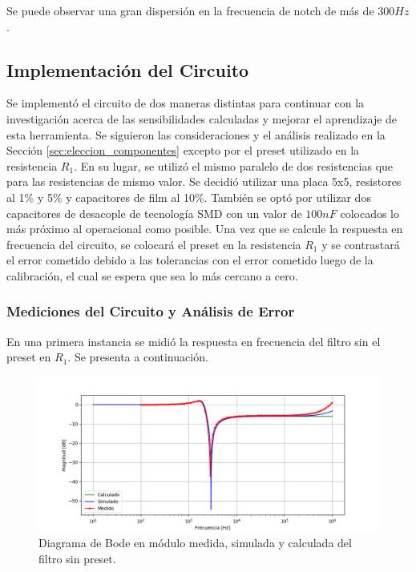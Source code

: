Se puede observar una gran dispersión en la frecuencia de notch de más de $300Hz$.

\subsection{Implementación del Circuito}
Se implementó el circuito de dos maneras distintas para continuar con la investigación acerca de las sensibilidades calculadas y mejorar el aprendizaje de esta herramienta. Se siguieron las consideraciones y el análisis realizado en la Sección \ref{sec:eleccion_componentes} excepto por el preset utilizado en la resistencia $R_1$. En su lugar, se utilizó el mismo paralelo de dos resistencias que para las resistencias de mismo valor. Se decidió utilizar una placa 5x5, resistores al 1\% y 5\% y capacitores de film al 10\%. También se optó por utilizar dos capacitores de desacople de tecnología SMD con un valor de $100nF$ colocados lo más próximo al operacional como posible. Una vez que se calcule la respuesta en frecuencia del circuito, se colocará el preset en la resistencia $R_1$ y se contrastará el error cometido debido a las tolerancias con el error cometido luego de la calibración, el cual se espera que sea lo más cercano a cero.
\subsubsection{Mediciones del Circuito y Análisis de Error}
\label{sec:mediciones}

En una primera instancia se midió la respuesta en frecuencia del filtro sin el preset en $R_1$. Se presenta a continuación.

\begin{figure}[H]
	\centering
	\includegraphics[width=\textwidth]{Imagenes/bode_calc_sim_med.PNG}
	\caption{Diagrama de Bode en módulo medida, simulada y calculada del filtro sin preset.}
	\label{fig:bode_calc_sim_med}
\end{figure}

